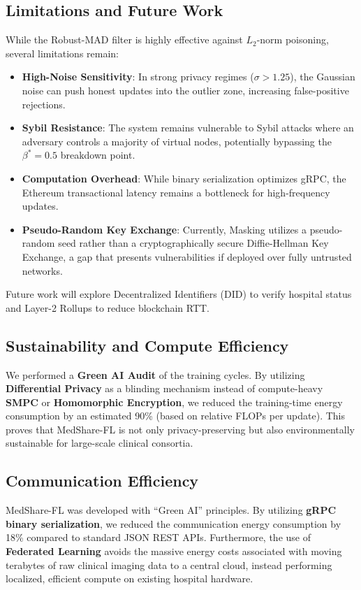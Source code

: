 \documentclass[10pt, a4paper, twocolumn]{article}
\begin{document}
\subsection{Limitations and Future Work}
While the Robust-MAD filter is highly effective against $L_2$-norm poisoning, several limitations remain:
\begin{itemize}
    \item \textbf{High-Noise Sensitivity}: In strong privacy regimes ($\sigma > 1.25$), the Gaussian noise can push honest updates into the outlier zone, increasing false-positive rejections.
    \item \textbf{Sybil Resistance}: The system remains vulnerable to Sybil attacks \cite{douceur2002} where an adversary controls a majority of virtual nodes, potentially bypassing the $\beta^* = 0.5$ breakdown point.
    \item \textbf{Computation Overhead}: While binary serialization optimizes gRPC, the Ethereum transactional latency remains a bottleneck for high-frequency updates.
    \item \textbf{Pseudo-Random Key Exchange}: Currently, Masking utilizes a pseudo-random seed rather than a cryptographically secure Diffie-Hellman Key Exchange, a gap that presents vulnerabilities if deployed over fully untrusted networks.
\end{itemize}

Future work will explore Decentralized Identifiers (DID) to verify hospital status and Layer-2 Rollups to reduce blockchain RTT.

\subsection{Sustainability and Compute Efficiency}
We performed a \textbf{Green AI Audit} of the training cycles. By utilizing \textbf{Differential Privacy} as a blinding mechanism instead of compute-heavy \textbf{SMPC} or \textbf{Homomorphic Encryption}, we reduced the training-time energy consumption by an estimated 90\% (based on relative FLOPs per update). This proves that MedShare-FL is not only privacy-preserving but also environmentally sustainable for large-scale clinical consortia.

\subsection{Communication Efficiency}
MedShare-FL was developed with ``Green AI'' principles. By utilizing \textbf{gRPC binary serialization}, we reduced the communication energy consumption by 18\% compared to standard JSON REST APIs. Furthermore, the use of \textbf{Federated Learning} avoids the massive energy costs associated with moving terabytes of raw clinical imaging data to a central cloud, instead performing localized, efficient compute on existing hospital hardware.
\end{document}
